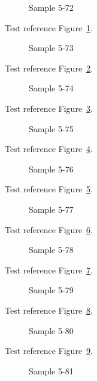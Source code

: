 \begin{figure}[tbhp]
\caption{Sample 5-72}
\label{fig:sample-5-72}
\end{figure}

Test reference Figure~\ref{fig:sample-5-72}.

\begin{figure}[tbhp]
\caption{Sample 5-73}
\label{fig:sample-5-73}
\end{figure}

Test reference Figure~\ref{fig:sample-5-73}.

\begin{figure}[tbhp]
\caption{Sample 5-74}
\label{fig:sample-5-74}
\end{figure}

Test reference Figure~\ref{fig:sample-5-74}.

\begin{figure}[tbhp]
\caption{Sample 5-75}
\label{fig:sample-5-75}
\end{figure}

Test reference Figure~\ref{fig:sample-5-75}.

\begin{figure}[tbhp]
\caption{Sample 5-76}
\label{fig:sample-5-76}
\end{figure}

Test reference Figure~\ref{fig:sample-5-76}.

\begin{figure}[tbhp]
\caption{Sample 5-77}
\label{fig:sample-5-77}
\end{figure}

Test reference Figure~\ref{fig:sample-5-77}.

\begin{figure}[tbhp]
\caption{Sample 5-78}
\label{fig:sample-5-78}
\end{figure}

Test reference Figure~\ref{fig:sample-5-78}.

\begin{figure}[tbhp]
\caption{Sample 5-79}
\label{fig:sample-5-79}
\end{figure}

Test reference Figure~\ref{fig:sample-5-79}.

\begin{figure}[tbhp]
\caption{Sample 5-80}
\label{fig:sample-5-80}
\end{figure}

Test reference Figure~\ref{fig:sample-5-80}.

\begin{figure}[tbhp]
\caption{Sample 5-81}
\label{fig:sample-5-81}
\end{figure}

